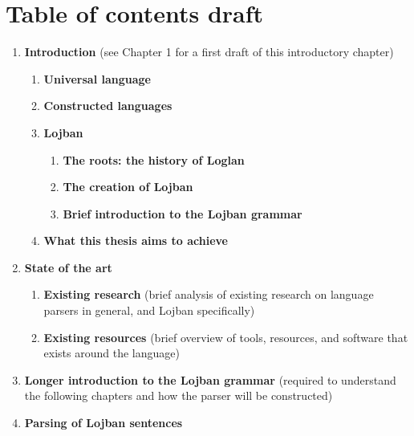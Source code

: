 \chapter{Table of contents draft}
\label{chap:draft_toc}

\begin{enumerate}
    \item \textbf{Introduction} (see Chapter 1 for a first draft of this introductory chapter)
        \vspace{-0.4cm}
        \begin{enumerate}[label*=\arabic*.]
            \setlength\itemsep{-0.5em}
            \item \textbf{Universal language}
            \item \textbf{Constructed languages}
            \item \textbf{Lojban}
            \vspace{-0.4cm}
            \begin{enumerate}[label*=\arabic*.]
                \setlength\itemsep{-0.5em}
                \item \textbf{The roots: the history of Loglan}
                \item \textbf{The creation of Lojban}
                \item \textbf{Brief introduction to the Lojban grammar}
            \end{enumerate}
            \item \textbf{What this thesis aims to achieve}
        \end{enumerate}
    \item \textbf{State of the art}
        \vspace{-0.4cm}
        \begin{enumerate}[label*=\arabic*.]
            \item \textbf{Existing research} (brief analysis of existing research on language parsers in general, and Lojban specifically)
            \item \textbf{Existing resources} (brief overview of tools, resources, and software that exists around the language)
        \end{enumerate}
    \item \textbf{Longer introduction to the Lojban grammar} (required to understand the following chapters and how the parser will be constructed)
    \item \textbf{Parsing of Lojban sentences}

\end{enumerate}
